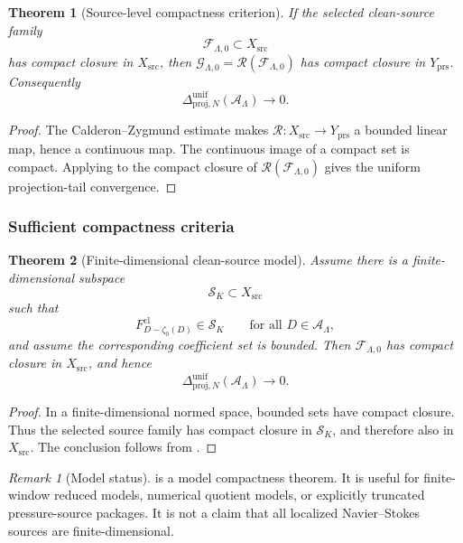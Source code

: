 \documentclass[11pt]{article}
\numberwithin{equation}{section}
\newtheorem{theorem}{Theorem}[section]
\theoremstyle{definition}
\theoremstyle{remark}
\newtheorem{remark}[remark]{Remark}
\newcommand{\prs}{\mathrm{prs}}
\newcommand{\proj}{\mathrm{proj}}
\newcommand{\src}{\mathrm{src}}
\newcommand{\cl}{\mathrm{cl}}
\begin{document}
\begin{theorem}[Source-level compactness criterion]
\label{thm:source-level-compactness-criterion}
If the selected clean-source family
\[
    \mathcal F_{\Lambda,0}\subset X_{\src}
\]
has compact closure in \(X_{\src}\), then
\(\mathcal G_{\Lambda,0}=\mathcal R(\mathcal F_{\Lambda,0})\) has compact
closure in \(Y_{\prs}\).  Consequently
\[
    \Delta^{\mathrm{unif}}_{\proj,N}(\mathcal A_\Lambda)\to0.
\]
\end{theorem}

\begin{proof}
The Calderon--Zygmund estimate makes
\(\mathcal R:X_{\src}\to Y_{\prs}\) a bounded linear map, hence a continuous map.
The continuous image of a compact set is compact.  Applying
 to the compact closure of
\(\mathcal R(\mathcal F_{\Lambda,0})\) gives the uniform projection-tail
convergence.
\end{proof}

\subsubsection{Sufficient compactness criteria}

\begin{theorem}[Finite-dimensional clean-source model]
\label{thm:finite-dimensional-source-model}
Assume there is a finite-dimensional subspace
\[
    \mathcal S_K\subset X_{\src}
\]
such that
\[
    F^{\cl}_{D-\zeta_0(D)}\in\mathcal S_K
    \qquad
    \text{for all }D\in\mathcal A_\Lambda,
\]
and assume the corresponding coefficient set is bounded.  Then
\(\mathcal F_{\Lambda,0}\) has compact closure in \(X_{\src}\), and hence
\[
    \Delta^{\mathrm{unif}}_{\proj,N}(\mathcal A_\Lambda)\to0.
\]
\end{theorem}

\begin{proof}
In a finite-dimensional normed space, bounded sets have compact closure.
Thus the selected source family has compact closure in \(\mathcal S_K\), and
therefore also in \(X_{\src}\).  The conclusion follows from
.
\end{proof}

\begin{remark}[Model status]
 is a model compactness theorem.
It is useful for finite-window reduced models, numerical quotient models, or
explicitly truncated pressure-source packages.  It is not a claim that all
localized Navier--Stokes sources are finite-dimensional.
\end{remark}
\end{document}
